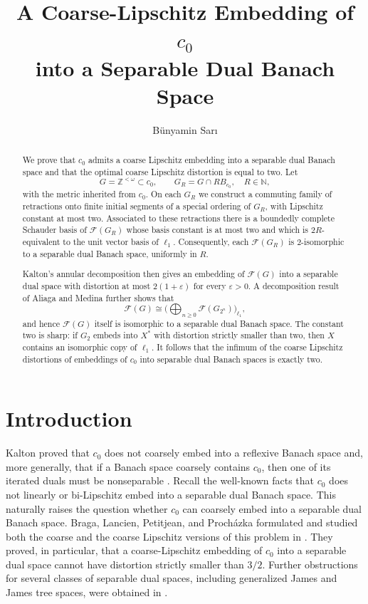 \documentclass[11pt]{amsart}
\title[Coarse-Lipschitz embedding into a separable dual]{A Coarse-Lipschitz Embedding of $c_0$\\
into a Separable Dual Banach Space}
\author{B\"unyamin Sar\i}
\theoremstyle{definition}
\begin{document}
\maketitle

\begin{abstract}
We prove that $c_0$ admits a coarse Lipschitz embedding into a
separable dual Banach space and that the optimal coarse Lipschitz distortion is equal to two.  Let
$$
G=\mathbb Z^{<\omega}\subset c_0,
\qquad
G_R=G\cap R B_{c_0},
\quad R\in\mathbb N,
$$
with the metric inherited from $c_0$.  On each $G_R$ we construct a
commuting family of retractions onto finite initial segments of a special ordering of $G_R$, with
Lipschitz constant at most two.  Associated to these retractions there is a boundedly complete Schauder basis of $\mathcal F(G_R)$ whose
basis constant is at most two and which is $2R$-equivalent to the unit vector basis of $\ell_1$.  Consequently, each $\mathcal F(G_R)$ is
$2$-isomorphic to a separable dual Banach space, uniformly in $R$.

Kalton's annular decomposition then gives an embedding of
$\mathcal F(G)$ into a separable dual space with distortion at
most $2(1+\varepsilon)$ for every $\varepsilon>0$.  A decomposition
result of Aliaga and Medina further shows that
\[
\mathcal F(G)
\cong
\Big(
\bigoplus_{n\geq0}\mathcal F(G_{2^n})
\Big)_{\ell_1},
\]
and hence $\mathcal F(G)$ itself is isomorphic to a separable dual
Banach space.  The constant two is sharp: if $G_2$ embeds into $X^*$ with distortion strictly smaller than
two, then $X$ contains an isomorphic copy of $\ell_1$.  It follows that
the infimum of the coarse Lipschitz distortions of embeddings of
$c_0$ into separable dual Banach spaces is exactly two.
\end{abstract}




\section{Introduction}


Kalton proved that $c_0$ does not coarsely embed into a reflexive Banach space and, more generally, that if a Banach space coarsely contains $c_0$, then one of its iterated duals must be nonseparable \cite{Kalton2007}. Recall the well-known facts that $c_0$ does not linearly or bi-Lipschitz embed into a separable dual Banach space. This naturally raises the question whether $c_0$ can coarsely embed into a separable dual Banach space. Braga, Lancien, Petitjean, and Proch\'azka formulated and studied both the coarse and the coarse Lipschitz versions of this problem in \cite[Problem 1.2, 1.3]{BLPP}. They proved, in particular, that a coarse-Lipschitz embedding of $c_0$ into a separable dual space cannot have distortion strictly smaller than $3/2$. Further obstructions for several classes of separable dual spaces, including generalized James and James tree spaces, were obtained in \cite{JKS}. 
\end{document}
